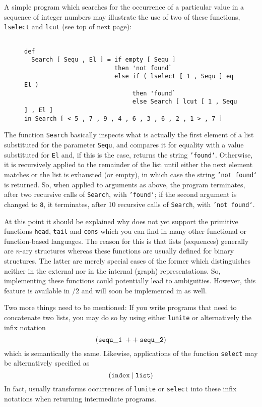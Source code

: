 A simple program which searches for the occurrence of a particular value in a sequence of
integer numbers  may illustrate the use of two of these functions,
{\tt lselect} and {\tt lcut} (see top of next page):

\begin{figure}
\begin{verbatim}

def 
  Search [ Sequ , El ] = if empty [ Sequ ]
                         then 'not found`
                         else if ( lselect [ 1 , Sequ ] eq El )
                              then 'found`
                              else Search [ lcut [ 1 , Sequ ] , El ]
in Search [ < 5 , 7 , 9 , 4 , 6 , 3 , 6 , 2 , 1 > , 7 ]

\end{verbatim}
\end{figure}
The function {\tt Search} basically inspects what is actually 
the first element of a list substituted
for the parameter {\tt Sequ}, and compares it for  equality with a value substituted for {\tt El} and, if
this is the case, returns the string {\tt 'found`}. Otherwise, it is recursively applied
to the remainder of the list until either the next element matches or the list is exhausted
(or empty), in which case the string {\tt 'not found`} is returned. So, when applied to arguments as
above, the program terminates, after two recursive calls of {\tt Search}, with {\tt 'found`}; if the
 second argument is changed to {\tt 8}, it terminates, after 10 recursive calls of {\tt Search}, with
{\tt 'not found`}.

At this point it should be explained why \kir does not yet support the primitive functions
{\tt head}, {\tt tail} and {\tt cons} which you can find in  many other functional or
function-based languages. The reason for this is that lists (sequences) generally are $n$-ary
 structures whereas these functions are usually defined for binary structures. The latter are
merely  special cases of the former which \pired distinguishes neither in the external nor in
the internal (graph) representations. So, implementing these functions could potentially
lead to ambiguities. However, this feature is available in \orel/2 and will soon be implemented in \kir as well. 

Two more things need to be mentioned: If you write programs that need to concatenate
two lists,
you may do so by using either {\tt lunite} or alternatively the infix notation
$$
{\tt (sequ\_1\; ++\; sequ\_2)}
$$
which is semantically the same. Likewise, applications of the function {\tt select} may be
alternatively specified as
$$
{\tt (index\;|\; list)}
$$
In fact, \pired usually transforms occurrences of
{\tt lunite} or {\tt select} into these infix notations when returning intermediate programs.

